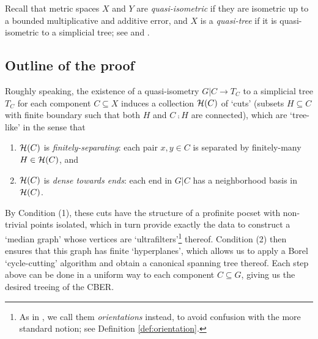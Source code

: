 \documentclass{amsart}
\begin{document}
    Recall that metric spaces $X$ and $Y$ are \textit{quasi-isometric} if they are isometric up to a bounded multiplicative and additive error, and $X$ is a \textit{quasi-tree} if it is quasi-isometric to a simplicial tree; see \cite{Gro93} and \cite{DK18}.

    \subsection{Outline of the proof}

    Roughly speaking, the existence of a quasi-isometry $G|C\to T_C$ to a simplicial tree $T_C$ for each component $C\subseteq X$ induces a collection $\mathcal{H}(C)$ of `cuts' (subsets $H\subseteq C$ with finite boundary such that both $H$ and $C\comp H$ are connected), which are `tree-like' in the sense that
    \begin{enumerate}
        \item[1.] $\mathcal{H}(C)$ is \textit{finitely-separating}: each pair $x,y\in C$ is separated by finitely-many $H\in\mathcal{H}(C)$, and
        \item[2.] $\mathcal{H}(C)$ is \textit{dense towards ends}: each end in $G|C$ has a neighborhood basis in $\mathcal{H}(C)$.
    \end{enumerate}
    By Condition (1), these cuts have the structure of a profinite pocset with non-trivial points isolated, which in turn provide exactly the data to construct a `median graph' whose vertices are `ultrafilters'\footnote{As in \cite{CPTT23}, we call them \textit{orientations} instead, to avoid confusion with the more standard notion; see Definition \ref{def:orientation}.} thereof. Condition (2) then ensures that this graph has finite `hyperplanes', which allows us to apply a Borel `cycle-cutting' algorithm and obtain a canonical spanning tree thereof. Each step above can be done in a uniform way to each component $C\subseteq G$, giving us the desired treeing of the CBER.
\end{document}
